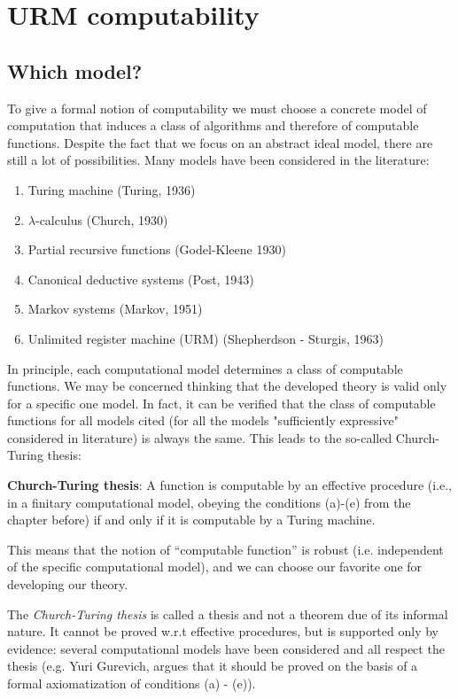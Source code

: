 \chapter{URM computability}

\section {Which model?}

To give a formal notion of computability we must choose a concrete model of computation that induces a class of algorithms and therefore of computable functions. 
Despite the fact that we focus on an abstract ideal model, there are still a lot of possibilities. Many models have been considered in the literature:

\begin{enumerate}
\item Turing machine (Turing, 1936)
\item $\lambda$-calculus (Church, 1930)
\item Partial recursive functions (Godel-Kleene 1930)
\item Canonical deductive systems (Post, 1943)
\item Markov systems (Markov, 1951)
\item Unlimited register machine (URM) (Shepherdson - Sturgis, 1963)
\end{enumerate}

In principle, each computational model determines a class of computable functions.
We may be concerned thinking that the developed theory is valid only for a specific one
model. In fact, it can be verified that the class of computable functions for all
models cited (for all the models "sufficiently expressive" considered
in literature) is always the same. This leads to the so-called Church-Turing
thesis:

\textbf{Church-Turing thesis}: A function is computable by an
effective procedure (i.e., in a finitary computational model, obeying the conditions (a)-(e) from the chapter before) if and only if it is computable
by a Turing machine.


This means that the notion of ``computable function'' is robust (i.e. independent of the specific computational model), and we can choose our favorite one for developing our theory.

\begin{remark}
  The \emph{Church-Turing thesis} is called a thesis and not a theorem due
  of its informal nature. 
  It cannot be proved w.r.t effective procedures, but is supported only by evidence: 
  several computational models have been considered and all respect the thesis 
  (e.g. Yuri Gurevich, argues that it should be proved on the basis of a formal
  axiomatization of conditions (a) - (e)).
\end{remark}

